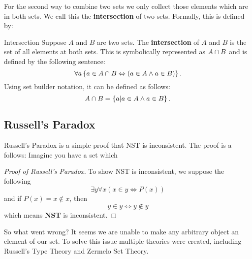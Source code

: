 For the second way to combine two sets we only collect those elements which are in both sets.
We call this the \textbf{intersection} of two sets.
Formally, this is defined by:
\begin{defn}{Intersection}
  Suppose $A$ and $B$ are two sets.
  The \textbf{intersection} of $A$ and $B$ is the set of all elements at both sets.
  This is symbolically represented as $A \cap B$ and is defined by the following sentence:
  $$
  \forall a \left\{ a \in A \cap B \Leftrightarrow (a \in A \wedge a \in B) \right\}.
  $$
  Using set builder notation, it can be defined as follows:
  $$
    A \cap B =  \left\{ a | a \in A \wedge a \in B \right\}.
  $$
\end{defn}


\subsection{Russell's Paradox}
\label{set:russellsparadox}
Russell's Paradox is a simple proof that NST is inconsistent.
The proof is a follows: Imagine you have a set which 

\begin{proof}[Proof of Russell's Paradox]
  To show NST is inconsistent, we suppose the following
  $$
    \exists y \forall x (x \in y \iff P(x))
  $$
  and if $P(x) = x \notin x$, then
  $$
    y \in y \iff y \notin y
  $$
which means \textbf{NST} is inconsistent.
\end{proof}

So what went wrong?
It seems we are unable to make any arbitrary object an element of our set.
To solve this issue multiple theories were created, including Russell's Type Theory and Zermelo Set Theory.

